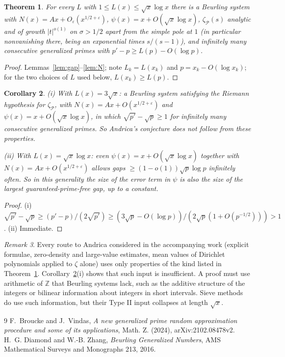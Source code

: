 \documentclass[11pt]{amsart}
\newtheorem{theorem}{Theorem}
\newtheorem{corollary}[theorem]{Corollary}
\theoremstyle{remark}\newtheorem{remark}[theorem]{Remark}
\begin{document}
\begin{theorem}\label{thm:main}
For every $L$ with $1\le L(x)\le\sqrt x\log x$ there is a Beurling system with $N(x)=Ax+O_\varepsilon(x^{1/2+\varepsilon})$, $\psi(x)=x+O(\sqrt x\log x)$, $\zeta_{\mathcal P}(s)$ analytic and of growth $|t|^{o(1)}$ on $\sigma>1/2$ apart from the simple pole at $1$ (in particular nonvanishing there, being an exponential times $s/(s-1)$), and infinitely many consecutive generalized primes with $p'-p\ge L(p)-O(\log p)$.
\end{theorem}
\begin{proof}
Lemmas~\ref{lem:gap}--\ref{lem:N}; note $L_k=L(x_k)$ and $p=x_k-O(\log x_k)$; for the two choices of $L$ used below, $L(x_k)\ge L(p)$.
\end{proof}

\begin{corollary}\label{cor}
(i) With $L(x)=3\sqrt x$: a Beurling system satisfying the Riemann hypothesis for $\zeta_{\mathcal P}$, with $N(x)=Ax+O(x^{1/2+\varepsilon})$ and $\psi(x)=x+O(\sqrt x\log x)$, in which $\sqrt{p'}-\sqrt p\ge 1$ for infinitely many consecutive generalized primes. So Andrica's conjecture does not follow from these properties.

(ii) With $L(x)=\sqrt x\log x$: even $\psi(x)=x+O(\sqrt x\log x)$ together with $N(x)=Ax+O(x^{1/2+\varepsilon})$ allows gaps $\ge(1-o(1))\sqrt p\log p$ infinitely often. So in this generality the size of the error term in $\psi$ is also the size of the largest guaranteed-prime-free gap, up to a constant.
\end{corollary}
\begin{proof}
(i) $\sqrt{p'}-\sqrt p\ge (p'-p)/(2\sqrt{p'})\ge (3\sqrt p-O(\log p))/(2\sqrt{p}(1+O(p^{-1/2})))>1$. (ii) Immediate.
\end{proof}

\begin{remark}
Every route to Andrica considered in the accompanying work (explicit formulae, zero-density and large-value estimates, mean values of Dirichlet polynomials applied to $\zeta$ alone) uses only properties of the kind listed in Theorem~\ref{thm:main}. Corollary~\ref{cor}(i) shows that such input is insufficient. A proof must use arithmetic of $\mathbb Z$ that Beurling systems lack, such as the additive structure of the integers or bilinear information about integers in short intervals. Sieve methods do use such information, but their Type II input collapses at length $\sqrt x$.
\end{remark}

\begin{thebibliography}{9}
 F.~Broucke and J.~Vindas, \emph{A new generalized prime random approximation procedure and some of its applications}, Math. Z. (2024), arXiv:2102.08478v2.
 H.~G. Diamond and W.-B. Zhang, \emph{Beurling Generalized Numbers}, AMS Mathematical Surveys and Monographs 213, 2016.
\end{thebibliography}
\end{document}
